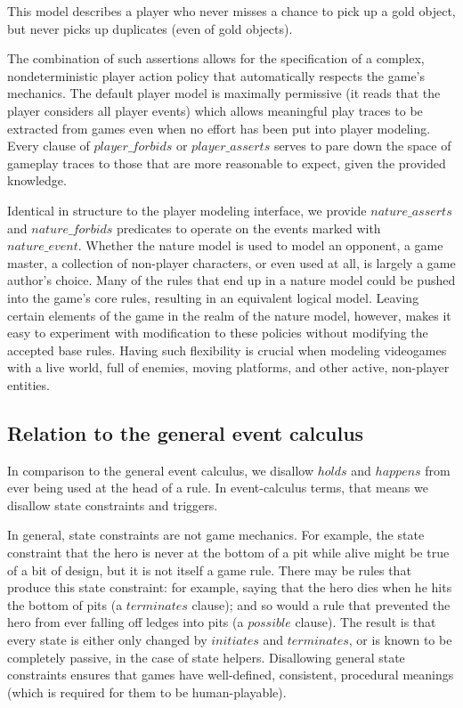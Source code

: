 \documentclass[conference]{IEEEtran}
\newcommand{\logical}[1]{$#1$}
\begin{document}
This model describes a player who never misses a chance to pick up a gold
object, but never picks up duplicates (even of gold objects).

The combination of such assertions allows for the specification of a complex,
nondeterministic player action policy that automatically respects the game's
mechanics. The default player model is maximally permissive (it reads that the
player considers all player events) which allows meaningful play traces to be
extracted from games even when no effort has been put into player modeling.
Every clause of \logical{player\_forbids} or \logical{player\_asserts} serves to
pare down the space of gameplay traces to those that are more reasonable to expect,
given the provided knowledge.

Identical in structure to the player modeling interface, we provide
\logical{nature\_asserts} and \logical{nature\_forbids} predicates to operate on
the events marked with \logical{nature\_event}. Whether the nature model is used
to model an opponent, a game master, a collection of non-player characters, or
even used at all, is largely a game author's choice. Many of the rules
that end up in a nature model could be pushed into the game's core rules,
resulting in an equivalent logical model. Leaving certain elements of the game
in the realm of the nature model, however, makes it easy to experiment with
modification to these policies without modifying the accepted base rules. Having
such flexibility is crucial when modeling videogames with a live world, full
of enemies, moving platforms, and other active, non-player entities.

\subsection{Relation to the general event calculus}

In comparison to the general event calculus, we disallow \logical{holds} and
\logical{happens} from ever being used at the head of a rule. In event-calculus
terms, that means we disallow state constraints and triggers.

In general, state constraints are not game mechanics. For example, the state
constraint that the hero is never at the bottom of a pit while alive might be
true of a bit of design, but it is not itself a game rule. There may be rules that
produce this state constraint: for example, saying that the hero dies when he
hits the bottom of pits (a \logical{terminates} clause); and so would a rule
that prevented the hero from ever falling off ledges into pits (a
\logical{possible} clause). The result is that every state is either
only changed by \logical{initiates} and \logical{terminates}, or is known
to be completely passive, in the case of state helpers. Disallowing general
state constraints ensures that games have well-defined, consistent, procedural
meanings (which is required for them to be human-playable).
\end{document}
